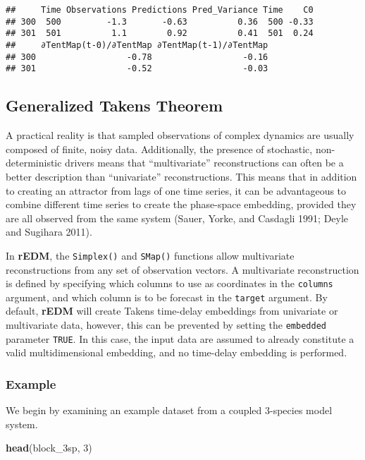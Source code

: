 \documentclass[]{article}
\newenvironment{Shaded}{\begin{snugshade}}{\end{snugshade}}
\newcommand{\DecValTok}[1]{\textcolor[rgb]{0.00,0.00,0.81}{#1}}
\newcommand{\KeywordTok}[1]{\textcolor[rgb]{0.13,0.29,0.53}{\textbf{#1}}}
\newcommand{\NormalTok}[1]{#1}
\begin{document}
\begin{verbatim}
##     Time Observations Predictions Pred_Variance Time    C0
## 300  500         -1.3       -0.63          0.36  500 -0.33
## 301  501          1.1        0.92          0.41  501  0.24
##     ∂TentMap(t-0)/∂TentMap ∂TentMap(t-1)/∂TentMap
## 300                  -0.78                  -0.16
## 301                  -0.52                  -0.03
\end{verbatim}

\hypertarget{generalized-takens-theorem}{%
\subsection{Generalized Takens
Theorem}\label{generalized-takens-theorem}}

A practical reality is that sampled observations of complex dynamics are
usually composed of finite, noisy data. Additionally, the presence of
stochastic, non-deterministic drivers means that ``multivariate''
reconstructions can often be a better description than ``univariate''
reconstructions. This means that in addition to creating an attractor
from lags of one time series, it can be advantageous to combine
different time series to create the phase-space embedding, provided they
are all observed from the same system (Sauer, Yorke, and Casdagli 1991;
Deyle and Sugihara 2011).

In \textbf{rEDM}, the \texttt{Simplex()} and \texttt{SMap()} functions
allow multivariate reconstructions from any set of observation vectors.
A multivariate reconstruction is defined by specifying which columns to
use as coordinates in the \texttt{columns} argument, and which column is
to be forecast in the \texttt{target} argument. By default,
\textbf{rEDM} will create Takens time-delay embeddings from univariate
or multivariate data, however, this can be prevented by setting the
\texttt{embedded} parameter \texttt{TRUE}. In this case, the input data
are assumed to already constitute a valid multidimensional embedding,
and no time-delay embedding is performed.

\hypertarget{example-3}{%
\subsubsection{Example}\label{example-3}}

We begin by examining an example dataset from a coupled 3-species model
system.

\begin{Shaded}
\begin{Highlighting}[]
\KeywordTok{head}\NormalTok{(block_3sp, }\DecValTok{3}\NormalTok{)}
\end{Highlighting}
\end{Shaded}
\end{document}
